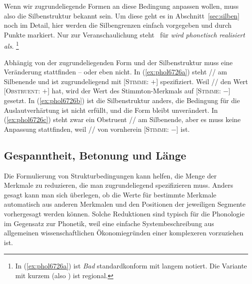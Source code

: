 
Wenn wir zugrundeliegende Formen an diese Bedingung anpassen wollen, muss also die Silbenstruktur bekannt sein.
Um diese geht es in Abschnitt~\ref{sec:silben} noch im Detail, hier werden die Silbengrenzen einfach vorgegeben und durch Punkte markiert. 
Nur zur Veranschaulichung steht \phopro\ für \textit{wird phonetisch  realisiert als}.%
\footnote{In (\ref{ex:phol6726a}) ist \textit{Bad} standardkonform mit langem \textipa{[a:]} notiert.
Die Variante mit kurzem \textipa{[a]} (also \textipa{[bat]}) ist regional.}

\begin{exe}
  \ex\label{ex:phol6726}
  \begin{xlist}
  \end{xlist}
\end{exe}

Abhängig von der zugrundeliegenden Form und der Silbenstruktur muss eine Veränderung stattfinden -- oder eben nicht.
In (\ref{ex:phol6726a}) steht // am Silbenende und ist zugrundeliegend mit [\textsc{Stimme}: $+$] spezifiziert.
Weil // den Wert [\textsc{Obstruent}: $+$] hat, wird der Wert des Stimmton-Merkmals auf [\textsc{Stimme}: $-$] gesetzt.
In (\ref{ex:phol6726b}) ist die Silbenstruktur anders, die Bedingung für die Auslautverhärtung ist nicht erfüllt, und die Form bleibt unverändert.
In (\ref{ex:phol6726c}) steht zwar ein Obstruent // am Silbenende, aber es muss keine Anpassung stattfinden, weil // von vornherein [\textsc{Stimme}: $-$] ist.

\subsection{Gespanntheit, Betonung und Länge}

\label{sec:gespanntheitbetonunglaenge}

Die Formulierung von Strukturbedingungen kann helfen, die Menge der Merkmale zu reduzieren, die man zugrundeliegend spezifizieren muss.
Anders gesagt kann man sich überlegen, ob die Werte für bestimmte Merkmale automatisch aus anderen Merkmalen und den Positionen der jeweiligen Segmente vorhergesagt werden können.
Solche Reduktionen sind typisch für die Phonologie im Gegensatz zur Phonetik, weil eine einfache Systembeschreibung aus allgemeinen wissenschaftlichen Ökonomiegründen einer komplexeren vorzuziehen ist.

